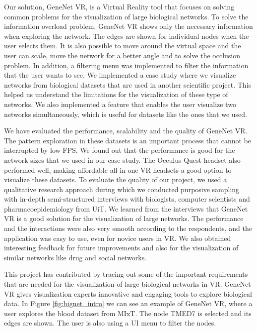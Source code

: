 Our solution, GeneNet VR, is a Virtual Reality tool that focuses on solving common problems for the visualization of large biological networks. To solve the information overload problem, GeneNet VR shows only the necessary information when exploring the network. The edges are shown for individual nodes when the user selects them. It is also possible to move around the virtual space and the user can scale, move the network for a better angle and to solve the occlusion problem. In addition, a filtering menu was implemented to filter the information that the user wants to see. We implemented a case study where we visualize networks from biological datasets that are used in another scientific project. This helped us understand the limitations for the visualization of these type of networks. We also implemented a feature that enables the user visualize two networks simultaneously, which is useful for datasets like the ones that we used.

We have evaluated the performance, scalability and the quality of GeneNet VR. The pattern exploration in these datasets is an important process that cannot be interrupted by low FPS. We found out that the performance is good for the network sizes that we used in our case study. The Occulus Quest headset also performed well, making affordable all-in-one VR headsets a good option to visualize these datasets. To evaluate the quality of our project, we used a qualitative research approach during which we conducted purposive sampling with in-depth semi-structured interviews with biologists, computer scientists and pharmacoepidemiology from UiT. We learned from the interviews that GeneNet VR is a good solution for the visualization of large networks. The performance and the interactions were also very smooth according to the respondents, and the application was easy to use, even for novice users in VR. We also obtained interesting feedback for future improvements and also for the visualization of similar networks like drug and social networks.

This project has contributed by tracing out some of the important requirements that are needed for the visualization of large biological networks in VR. GeneNet VR gives visualization experts innovative and engaging tools to explore biological data. In Figure \ref{fig:bignet_intro} we can see an example of GeneNet VR, where a user explores the blood dataset from MIxT. The node TMED7 is selected and its edges are shown. The user is also using a UI menu to filter the nodes.

